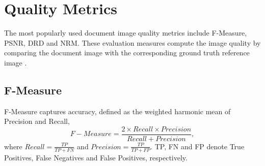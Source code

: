 \documentclass[10pt, a4paper, conference, compsocconf]{IEEEtran}
\begin{document}
\section{Quality Metrics}
\label{sec:doc}
The most popularly used document image quality metrics include F-Measure, PSNR, DRD and NRM. These evaluation measures compute the image quality by comparing the document image with the corresponding ground truth reference image \cite{gatos2009icdar,
pratikakis2016icfhr2016}. 


\subsection{F-Measure}
F-Measure captures accuracy, defined as the weighted harmonic mean of Precision and Recall, 
\begin{equation} 
F-Measure = \frac{ 2 \times Recall \times Precision}{Recall + Precision },
\label{eq_fm}
\end{equation}
where $Recall=\frac{TP}{TP + FN}$ and $Precision=\frac{TP}{TP + FP}$. TP, FN and FP denote True Positives, False Negatives and False Positives, respectively.

\end{document}
